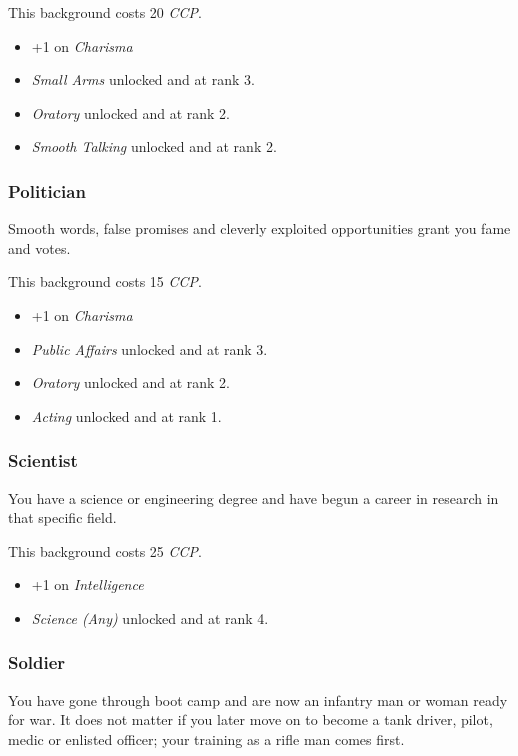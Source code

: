 This background costs 20 \emph{CCP}.

\begin{itemize}
\item +1 on \emph{Charisma}
\item \emph{Small Arms} unlocked and at rank 3.
\item \emph{Oratory} unlocked and at rank 2.
\item \emph{Smooth Talking} unlocked and at rank 2.
\end{itemize}

\subsubsection{Politician}

Smooth words, false promises and cleverly exploited opportunities grant you fame
and votes.

This background costs 15 \emph{CCP}.

\begin{itemize}
\item +1 on \emph{Charisma}
\item \emph{Public Affairs} unlocked and at rank 3.
\item \emph{Oratory} unlocked and at rank 2.
\item \emph{Acting} unlocked and at rank 1.
\end{itemize}

\subsubsection{Scientist}

You have a science or engineering degree and have begun a career in research in
that specific field.

This background costs 25 \emph{CCP}.

\begin{itemize}
\item +1 on \emph{Intelligence}
\item \emph{Science (Any)} unlocked and at rank 4.
\end{itemize}

\subsubsection{Soldier}

You have gone through boot camp and are now an infantry man or woman ready for
war. It does not matter if you later move on to become a tank driver, pilot,
medic or enlisted officer; your training as a rifle man comes first.

